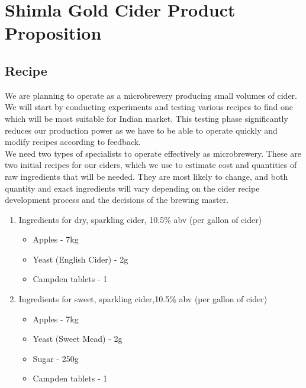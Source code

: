 \documentclass[11pt]{article}
\begin{document}
\section{Shimla Gold Cider Product Proposition}
  \subsection{Recipe}
We are planning to operate as a microbrewery producing small volumes of cider. We will start by conducting experiments and testing various recipes to find one which will be most suitable for Indian market. This testing phase significantly reduces our production power as we have to be able to operate quickly and modify recipes according to feedback.\\

\noindent We need two types of specialists to operate effectively as microbrewery. These are two initial recipes for our ciders, which we use to estimate cost and quantities of raw ingredients that will be needed. They are most likely to change, and both quantity and exact ingredients will vary depending on the cider recipe development process and the decisions of the brewing master.

		\begin{enumerate}
			\item Ingredients for dry, sparkling cider, 10.5\% abv (per gallon of cider) \\
				\begin{itemize}
					\item Apples - 7kg \\
					\item Yeast (English Cider) - 2g \\
					\item Campden tablets - 1 \\
				\end{itemize}

			\item Ingredients for sweet, sparkling cider,10.5\% abv (per gallon of cider) \\
				\begin{itemize}
					\item Apples - 7kg \\
					\item Yeast (Sweet Mead) - 2g \\
					\item Sugar - 250g \\
					\item Campden tablets - 1 \\
				\end{itemize}
			\end{enumerate}
\end{document}
